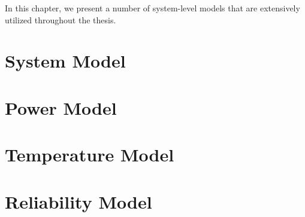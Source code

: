 In this chapter, we present a number of system-level models that are extensively
utilized throughout the thesis.

\section{System Model}

\section{Power Model}

\section{Temperature Model}

\section{Reliability Model}
